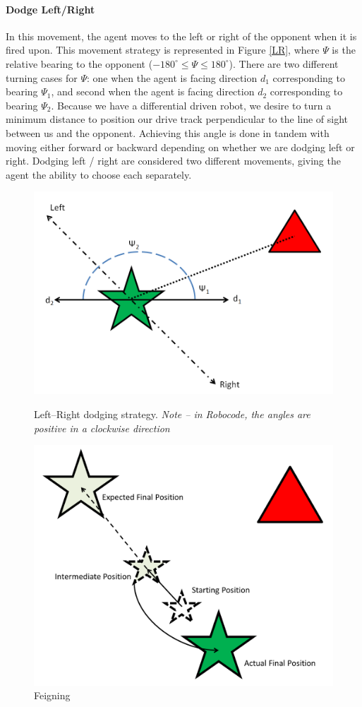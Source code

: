 \documentclass{article}
\theoremstyle{plain}
\theoremstyle{definition}
\theoremstyle{remark}
\begin{document}
\paragraph{Dodge Left/Right}
In this movement, the agent moves to the left or right of the opponent when it is fired upon. This movement strategy is represented in Figure \ref{LR}, where $\Psi$ is the relative bearing to the opponent ($-180^{\circ} \leq \Psi \leq 180^{\circ}$). There are two different turning cases for $\Psi$: one when the agent is facing direction $d_1$ corresponding to bearing $\Psi_1$, and second when the agent is facing direction $d_2$ corresponding to bearing $\Psi_2$. Because we have a differential driven robot, we desire to turn a minimum distance to position our drive track perpendicular to the line of sight between us and the opponent. Achieving this angle is done in tandem with moving either forward or backward depending on whether we are dodging left or right. Dodging left / right are considered two different movements, giving the agent the ability to choose each separately.

\begin{figure}[t]
\begin{minipage}[b]{0.5\linewidth}
	\centering
		\includegraphics[width=6 cm]{LR}
	\caption{Left--Right dodging strategy. \emph{Note -- in Robocode, the angles are positive in a clockwise direction}}
	\label{LR}
\end{minipage}
\hspace{0.5cm}
\begin{minipage}[b]{0.5\linewidth}
	\centering
		\includegraphics[width=6 cm]{Feign.png}
	\caption{Feigning}
	\label{feign}
\end{minipage}
\end{figure}
\end{document}
